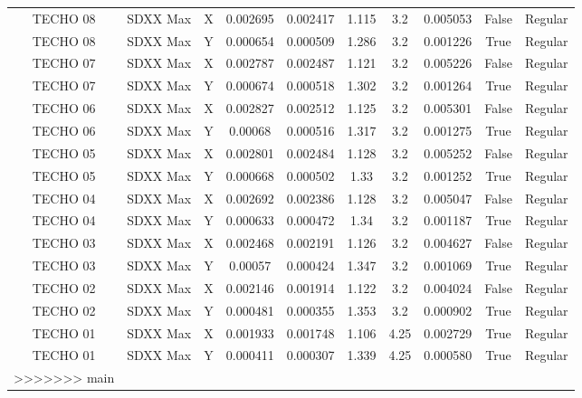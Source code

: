 \documentclass{article}%
\begin{document}
\begin{table}[ht!]
{\begin{tabular}{cccccccccc}
TECHO 08 & SDXX Max & X & 0.002695 & 0.002417 & 1.115 & 3.2 & 0.005053 & False & Regular \\
TECHO 08 & SDXX Max & Y & 0.000654 & 0.000509 & 1.286 & 3.2 & 0.001226 & True & Regular \\
TECHO 07 & SDXX Max & X & 0.002787 & 0.002487 & 1.121 & 3.2 & 0.005226 & False & Regular \\
TECHO 07 & SDXX Max & Y & 0.000674 & 0.000518 & 1.302 & 3.2 & 0.001264 & True & Regular \\
TECHO 06 & SDXX Max & X & 0.002827 & 0.002512 & 1.125 & 3.2 & 0.005301 & False & Regular \\
TECHO 06 & SDXX Max & Y & 0.00068 & 0.000516 & 1.317 & 3.2 & 0.001275 & True & Regular \\
TECHO 05 & SDXX Max & X & 0.002801 & 0.002484 & 1.128 & 3.2 & 0.005252 & False & Regular \\
TECHO 05 & SDXX Max & Y & 0.000668 & 0.000502 & 1.33 & 3.2 & 0.001252 & True & Regular \\
TECHO 04 & SDXX Max & X & 0.002692 & 0.002386 & 1.128 & 3.2 & 0.005047 & False & Regular \\
TECHO 04 & SDXX Max & Y & 0.000633 & 0.000472 & 1.34 & 3.2 & 0.001187 & True & Regular \\
TECHO 03 & SDXX Max & X & 0.002468 & 0.002191 & 1.126 & 3.2 & 0.004627 & False & Regular \\
TECHO 03 & SDXX Max & Y & 0.00057 & 0.000424 & 1.347 & 3.2 & 0.001069 & True & Regular \\
TECHO 02 & SDXX Max & X & 0.002146 & 0.001914 & 1.122 & 3.2 & 0.004024 & False & Regular \\
TECHO 02 & SDXX Max & Y & 0.000481 & 0.000355 & 1.353 & 3.2 & 0.000902 & True & Regular \\
TECHO 01 & SDXX Max & X & 0.001933 & 0.001748 & 1.106 & 4.25 & 0.002729 & True & Regular \\
TECHO 01 & SDXX Max & Y & 0.000411 & 0.000307 & 1.339 & 4.25 & 0.000580 & True & Regular \\
>>>>>>> main
\bottomrule
\end{tabular}
}%
\end{table}

%
\end{document}
